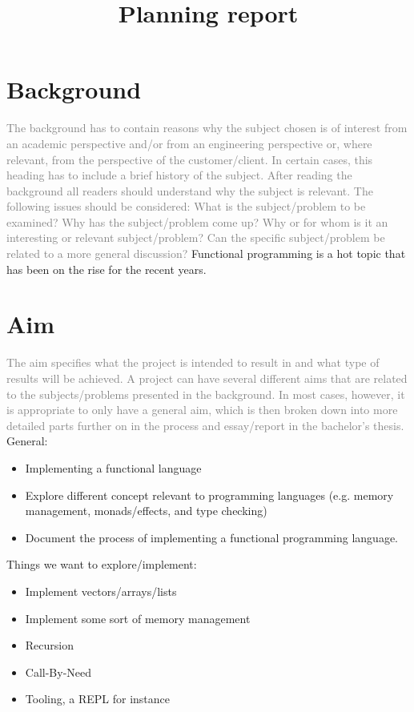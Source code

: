 \documentclass[12pt,a4paper]{article}
\title{Planning report}
\begin{document}
\maketitle
\section{Background}
\textcolor{gray}{
The background has to contain reasons why the subject chosen is of interest from an
academic perspective and/or from an engineering perspective or, where relevant, from the
perspective of the customer/client. In certain cases, this heading has to include a brief
history of the subject. After reading the background all readers should understand why the
subject is relevant. The following issues should be considered:
What is the subject/problem to be examined? Why has the subject/problem come up? Why
or for whom is it an interesting or relevant subject/problem? Can the specific
subject/problem be related to a more general discussion?
}
Functional programming is a hot topic that has been on the rise for the recent years. 

\section{Aim}
\textcolor{gray}{
The aim specifies what the project is intended to result in and what type of results will be
achieved. A project can have several different aims that are related to the subjects/problems
presented in the background. In most cases, however, it is appropriate to only have a
general aim, which is then broken down into more detailed parts further on in the process
and essay/report in the bachelor’s thesis.
}
\\
General:
\begin{itemize}
    \item Implementing a functional language
    \item Explore different concept relevant to programming
          languages (e.g. memory management, monads/effects, and type 
          checking)
    \item Document the process of implementing a functional programming 
          language.
\end{itemize}
Things we want to explore/implement:
\begin{itemize}
    \item Implement vectors/arrays/lists
    \item Implement some sort of memory management
    \item Recursion
    \item Call-By-Need
    \item Tooling, a REPL for instance
\end{itemize}
\end{document}

